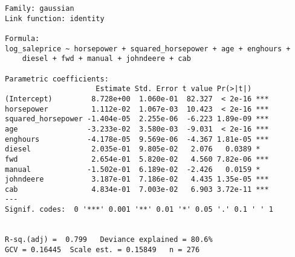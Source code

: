 \begin{verbatim}
Family: gaussian 
Link function: identity 

Formula:
log_saleprice ~ horsepower + squared_horsepower + age + enghours + 
    diesel + fwd + manual + johndeere + cab

Parametric coefficients:
                     Estimate Std. Error t value Pr(>|t|)    
(Intercept)         8.728e+00  1.060e-01  82.327  < 2e-16 ***
horsepower          1.112e-02  1.067e-03  10.423  < 2e-16 ***
squared_horsepower -1.404e-05  2.255e-06  -6.223 1.89e-09 ***
age                -3.233e-02  3.580e-03  -9.031  < 2e-16 ***
enghours           -4.178e-05  9.569e-06  -4.367 1.81e-05 ***
diesel              2.035e-01  9.805e-02   2.076   0.0389 *  
fwd                 2.654e-01  5.820e-02   4.560 7.82e-06 ***
manual             -1.502e-01  6.189e-02  -2.426   0.0159 *  
johndeere           3.187e-01  7.186e-02   4.435 1.35e-05 ***
cab                 4.834e-01  7.003e-02   6.903 3.72e-11 ***
---
Signif. codes:  0 '***' 0.001 '**' 0.01 '*' 0.05 '.' 0.1 ' ' 1


R-sq.(adj) =  0.799   Deviance explained = 80.6%
GCV = 0.16445  Scale est. = 0.15849   n = 276
\end{verbatim}